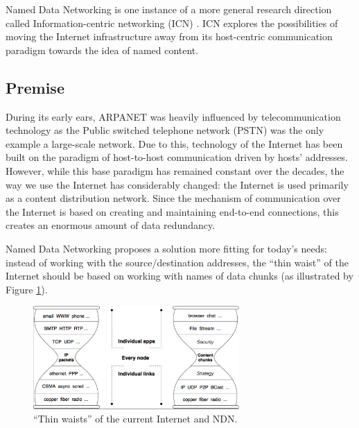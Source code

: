         Named Data Networking is one instance of a more general research direction called Information-centric networking (ICN) \cite{icn}. ICN explores the possibilities of moving the Internet infrastructure away from its host-centric communication paradigm towards the idea of named content.

        \subsection{Premise}

            During its early ears, ARPANET was heavily influenced by telecommunication technology as the Public switched telephone network (PSTN) was the only example a large-scale network. Due to this, technology of the Internet has been built on the paradigm of host-to-host communication driven by hosts' addresses. However, while this base paradigm has remained constant over the decades, the way we use the Internet has considerably changed: the Internet is used primarily as a content distribution network. Since the mechanism of communication over the Internet is based on creating and maintaining end-to-end connections, this creates an enormous amount of data redundancy.

            Named Data Networking proposes a solution more fitting for today's needs: instead of working with the source/destination addresses, the ``thin waist'' of the Internet should be based on working with names of data chunks (as illustrated by Figure \ref{fig:ndn_waist}).

            \begin{figure}[H]
                \begin{center}
                    \includegraphics[width=0.7\textwidth]{fig/archs_ndn-hourglass.png}
                  \caption{``Thin waists'' of the current Internet and NDN.}
                  \label{fig:ndn_waist}
                \end{center}
            \end{figure}

